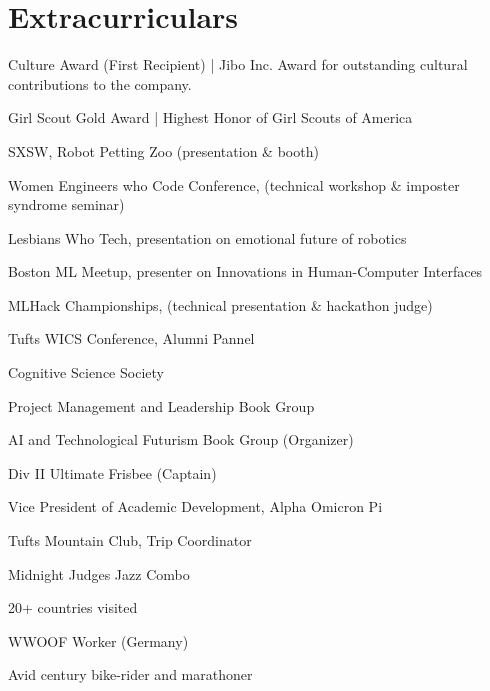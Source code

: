 \documentclass[]{csaund_resume-openfont}
\begin{document}

\section{Extracurriculars}
\descript{ }
\begin{tightemize}
\item Culture Award (First Recipient) | Jibo Inc. Award for outstanding cultural contributions to the company.
\item Girl Scout Gold Award | Highest Honor of Girl Scouts of America
\end{tightemize}
\sectionsep

\descript {}
\begin{tightemize}
\item SXSW, Robot Petting Zoo (presentation \& booth)
\item Women Engineers who Code Conference, (technical workshop \& imposter syndrome seminar)
\item Lesbians Who Tech, presentation on emotional future of robotics 
\item Boston ML Meetup, presenter on Innovations in Human-Computer Interfaces
\item MLHack Championships, (technical presentation \& hackathon judge)
\item Tufts WICS Conference, Alumni Pannel 
\end{tightemize}
\sectionsep

\descript{ }
\begin{tightemize}
\item Cognitive Science Society
\item Project Management and Leadership Book Group 
\item AI and Technological Futurism Book Group (Organizer)
\item Div II Ultimate Frisbee (Captain)
\end{tightemize}
\begin{tightemize}
\item Vice President of Academic Development, Alpha Omicron Pi
\item Tufts Mountain Club, Trip Coordinator
\item Midnight Judges Jazz Combo
\end{tightemize}
\begin{tightemize}
\item 20+ countries visited
\item WWOOF Worker (Germany)
\item Avid century bike-rider and marathoner
\end{tightemize}
\sectionsep
\end{document}
